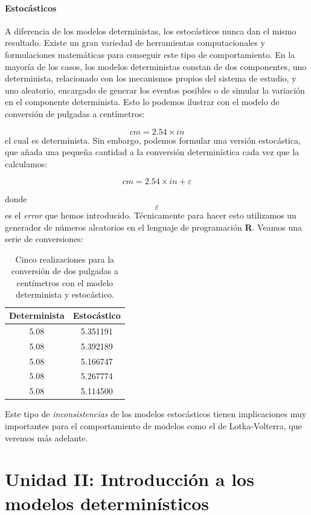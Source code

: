 \documentclass[
]{book}
\begin{document}
\hypertarget{estocuxe1sticos}{%
\subsubsection{Estocásticos}\label{estocuxe1sticos}}

A diferencia de los modelos deterministas, los estocásticos nunca dan el mismo resultado. Existe un gran variedad de herramientas computacionales y formulaciones matemáticas para conseguir este tipo de comportamiento. En la mayoría de los casos, los modelos deterministas constan de dos componentes, uno determinista, relacionado con los mecanismos propios del sistema de estudio, y uno aleatorio, encargado de generar los eventos posibles o de simular la variación en el componente determinista. Esto lo podemos ilustrar con el modelo de conversión de pulgadas a centímetros:

\[
cm = 2.54 \times in
\]
el cual es determinista. Sin embargo, podemos formular una versión estocástica, que añada una pequeña cantidad a la conversión determinística cada vez que la calculamos:

\[
cm = 2.54 \times in + \varepsilon
\]

donde \[\varepsilon\] es el \emph{error} que hemos introducido. Técnicamente para hacer esto utilizamos un generador de números aleatorios en el lenguaje de programación \textbf{R}. Veamos una serie de conversiones:

\begin{table}

\caption{\label{tab:unnamed-chunk-16}Cinco realizaciones para la conversión de dos pulgadas a centímetros con el modelo determinista y estocástico.}
\centering
\begin{tabular}[t]{c|c}
\hline
Determinista & Estocástico\\
\hline
5.08 & 5.351191\\
\hline
5.08 & 5.392189\\
\hline
5.08 & 5.166747\\
\hline
5.08 & 5.267774\\
\hline
5.08 & 5.114500\\
\hline
\end{tabular}
\end{table}

Este tipo de \emph{inconsistencias} de los modelos estocásticos tienen implicaciones muy importantes para el comportamiento de modelos como el de Lotka-Volterra, que veremos más adelante.

\hypertarget{unidad-ii-introducciuxf3n-a-los-modelos-determinuxedsticos}{%
\chapter{Unidad II: Introducción a los modelos determinísticos}\label{unidad-ii-introducciuxf3n-a-los-modelos-determinuxedsticos}}
\end{document}
